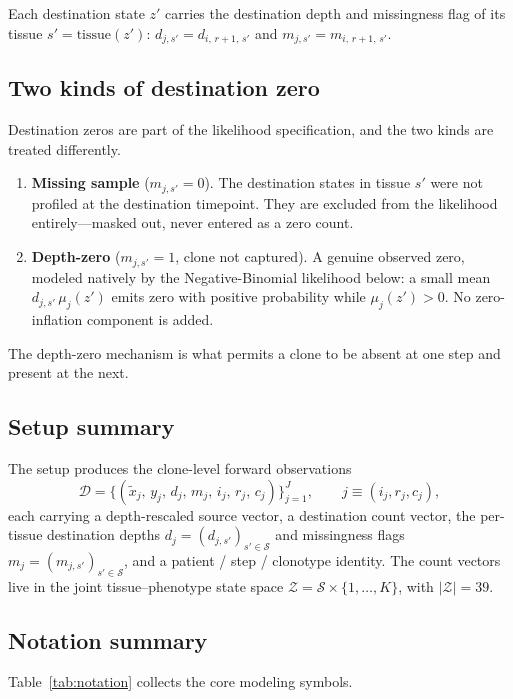 \documentclass[11pt]{article}
\newcommand{\Zsp}{\mathcal{Z}}                    %
\newcommand{\Ssp}{\mathcal{S}}                    %
\newcommand{\Dsp}{\mathcal{D}}                    %
\theoremstyle{definition}
\begin{document}
Each destination state $z'$ carries the destination depth and missingness flag
of its tissue $s' = \mathrm{tissue}(z')$:
$d_{j,s'} = d_{i,\,r+1,\,s'}$ and $m_{j,s'} = m_{i,\,r+1,\,s'}$.

\subsection{Two kinds of destination zero}

Destination zeros are part of the likelihood specification, and the two kinds
are treated differently.
\begin{enumerate}[leftmargin=2em, itemsep=3pt]
  \item \textbf{Missing sample} ($m_{j,s'} = 0$). The destination states in
        tissue $s'$ were not profiled at the destination timepoint. They are
        excluded from the likelihood entirely---masked out, never entered as a
        zero count.
  \item \textbf{Depth-zero} ($m_{j,s'} = 1$, clone not captured). A genuine
        observed zero, modeled natively by the Negative-Binomial likelihood below: a small
        mean $d_{j,s'}\,\mu_j(z')$ emits zero with positive probability while
        $\mu_j(z') > 0$. No zero-inflation component is added.
\end{enumerate}
The depth-zero mechanism is what permits a clone to be absent at one step and
present at the next.

\subsection{Setup summary}

The setup produces the clone-level forward observations
\[
  \Dsp = \bigl\{ (\tilde{x}_j,\, y_j,\, d_j,\, m_j,\, i_j,\, r_j,\, c_j) \bigr\}_{j=1}^{J},
  \qquad j \equiv (i_j, r_j, c_j),
\]
each carrying a depth-rescaled source vector, a destination count vector, the
per-tissue destination depths $d_j = (d_{j,s'})_{s'\in\Ssp}$ and missingness
flags $m_j = (m_{j,s'})_{s'\in\Ssp}$, and a patient / step / clonotype identity.
The count vectors live in the joint tissue--phenotype state space
$\Zsp = \Ssp \times \{1,\ldots,K\}$, with $|\Zsp| = 39$.

\subsection{Notation summary}

Table~\ref{tab:notation} collects the core modeling symbols.
\end{document}
